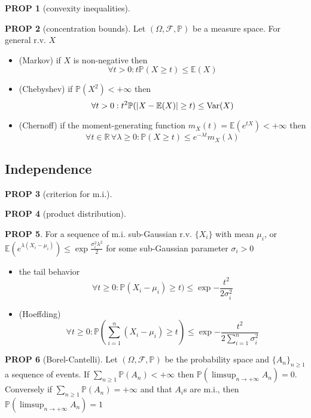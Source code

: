 \documentclass[hidelinks,11pt]{article}
\theoremstyle{definition}
\theoremstyle{dotles}
\theoremstyle{dotless}
\newtheorem{prop}{PROP}[section]
\theoremstyle{remark}
\DeclareMathOperator{\Var}{Var}
\begin{document}
\begin{prop}[convexity inequalities]

\end{prop}

\begin{prop}[concentration bounds]
Let $(\Omega,\mathcal{F},\mathbb{P})$ be a measure space. For general r.v. $X$
\begin{itemize}
    \item \textup{(Markov)} if $X$ is non-negative then
    \[\forall t>0:t\mathbb{P}(X\geq t)\leq\mathbb{E}(X)\]
    \item \textup{(Chebyshev)} if $\mathbb{P}(X^2)<+\infty$ then
    \[\forall t>0:t^2\mathbb{P}(\abs{X-\mathbb{E}(X)}\geq t)\leq\Var(X)\]
    \item \textup{(Chernoff)} if the moment-generating function $m_X(t)=\mathbb{E}(e^{tX})<+\infty$ then
    \[\forall t\in\mathbb{R}\,\forall \lambda\geq0:\mathbb{P}(X\geq t)\leq e^{-\lambda t}m_X(\lambda)\]
\end{itemize}
\end{prop}

\subsection{Independence}

\begin{prop}[criterion for m.i.]

\end{prop}

\begin{prop}[product distribution]

\end{prop}

\begin{prop}
For a sequence of m.i. sub-Gaussian r.v. $\{X_i\}$ with mean $\mu_i$, or $\mathbb{E}(e^{\lambda(X_i-\mu_i)})\leq\exp{\frac{\sigma_i^2\lambda^2}{2}}$ for some sub-Gaussian parameter $\sigma_i>0$\begin{itemize}
\item the tail behavior
\[\forall t\geq0:\mathbb{P}(X_i-\mu_i)\geq t)\leq\exp{-\frac{t^2}{2\sigma_i^2}}\]
\item \textup{(Hoeffding)}
\[\forall t\geq0:\mathbb{P}\left(\sum_{i=1}^n(X_i-\mu_i)\geq t\right)\leq\exp{-\frac{t^2}{2\sum_{i=1}^n\sigma_i^2}}\]
\end{itemize}
\end{prop}

\begin{prop}[Borel-Cantelli]
Let $(\Omega,\mathcal{F},\mathbb{P})$ be the probability space and $\{A_n\}_{n\geq1}$ a sequence of events. If $\sum_{n\geq1}\mathbb{P}(A_n)<+\infty$ then $\mathbb{P}(\limsup_{n\to+\infty}A_n)=0$. Conversely if $\sum_{n\geq1}\mathbb{P}(A_n)=+\infty$ and that $A_i$s are m.i., then $\mathbb{P}(\limsup_{n\to+\infty}A_n)=1$
\end{prop}
\end{document}
